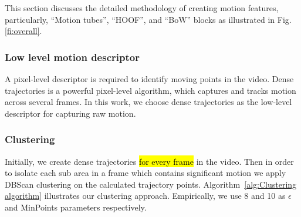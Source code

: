 This section discusses the detailed methodology of creating motion features, particularly, ``Motion tubes'', ``HOOF'', and ``BoW'' blocks as illustrated in Fig. \ref{fi:overall}.

\subsubsection{Low level motion descriptor}
A pixel-level descriptor is required to identify moving points in the video. Dense trajectories \cite{wang2011action} is a powerful
pixel-level algorithm, which captures and tracks motion across several frames. In this work,
we choose dense trajectories as the low-level descriptor for capturing raw motion.

\subsubsection{Clustering}

Initially, we create dense trajectories \hl{for every frame} in the video.
Then in order to isolate each sub area in a frame which contains significant motion we apply DBScan clustering on the calculated trajectory points.
Algorithm~\ref{alg:Clustering algorithm}  illustrates our clustering approach. Empirically, we use 8 and 10 as $\epsilon$ and MinPoints parameters respectively.



